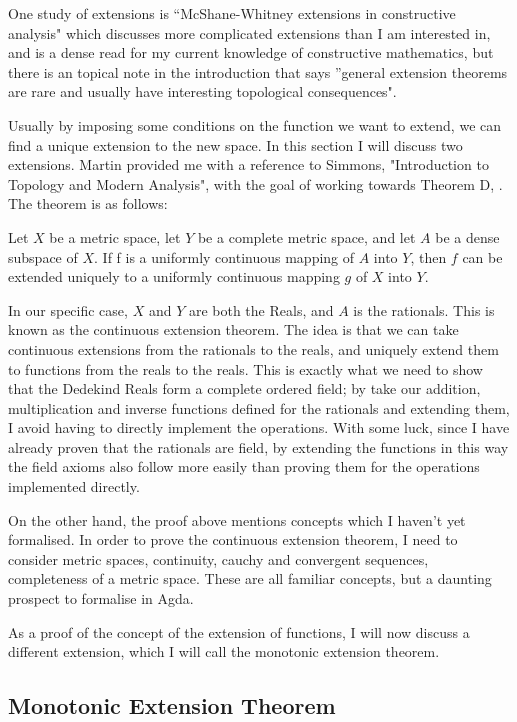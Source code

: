 \documentclass[ProjectReport]{subfiles}
\begin{document}

One study of extensions is ``McShane-Whitney extensions in constructive analysis" \cite{petrakis2020mcshane} which discusses more complicated extensions than I am interested in, and is a dense read for my current knowledge of constructive mathematics, but there is an topical note in the introduction that says ''general extension theorems are rare and usually have interesting topological consequences". 

Usually by imposing some conditions on the function we want to extend, we can find a unique extension to the new space. In this section I will discuss two extensions. Martin provided me with a reference to Simmons, "Introduction to Topology and Modern Analysis", with the goal of working towards Theorem D, \cite[Page 78]{simmons1983introduction}. The theorem is as follows:

Let $X$ be a metric space, let $Y$ be a complete metric space, and let $A$ be a dense subspace of $X$. If f is a uniformly continuous mapping of $A$ into $Y$, then $f$ can be extended uniquely to a uniformly continuous mapping $g$ of $X$ into $Y$.

In our specific case, $X$ and $Y$ are both the Reals, and $A$ is the rationals. This is known as the continuous extension theorem. The idea is that we can take continuous extensions from the rationals to the reals, and uniquely extend them to functions from the reals to the reals. This is exactly what we need to show that the Dedekind Reals form a complete ordered field; by take our addition, multiplication and inverse functions defined for the rationals and extending them, I avoid having to directly implement the operations. With some luck, since I have already proven that the rationals are field, by extending the functions in this way the field axioms also follow more easily than proving them for the operations implemented directly.

On the other hand, the proof above mentions concepts which I haven't yet formalised. In order to prove the continuous extension theorem, I need to consider metric spaces, continuity, cauchy and convergent sequences, completeness of a metric space. These are all familiar concepts, but a daunting prospect to formalise in Agda. 

As a proof of the concept of the extension of functions, I will now discuss a different extension, which I will call the monotonic extension theorem. 

\subsection{Monotonic Extension Theorem}
\end{document}
